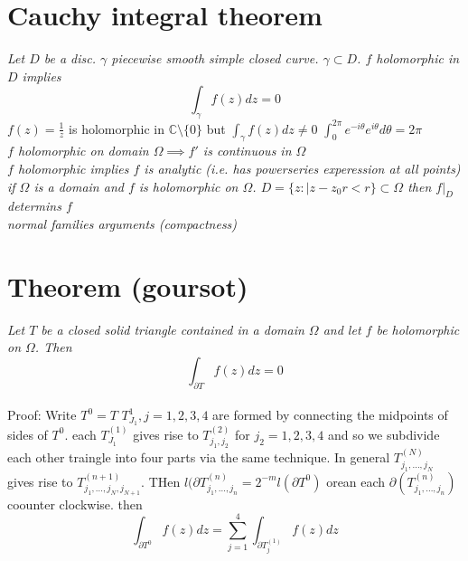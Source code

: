 \documentclass[11pt]{article}
\begin{document}
\section{Cauchy integral theorem}
\emph{
    Let $ D$ be a disc.  $\gamma$ piecewise smooth simple closed curve. $\gamma \subset D$. $f$ holomorphic in $D$  implies
     \[
    \int_{\gamma}^{}f(z)dz = 0
    \]
}
$f(z) = \frac{1}{z}$ is holomorphic in $ \mathbb{C} \setminus \{0\}$ but $\int_{ \gamma}^{}f(z)dz \ne 0$ $\int_{0}^{2\pi}e^{-i\theta}e^{i\theta}d\theta = 2\pi$
\\
\emph{
    $f$ holomorphic on domain $\Omega \implies f'$ is continuous in  $\Omega$
}
\\
\emph{
    $f$ holomorphic implies $f$ is analytic (i.e. has powerseries experession at all points)
}
\\
\emph{
    if $\Omega$ is a domain and  $f$ is holomorphic on $\Omega$.  $D = \{z : |z-z_0r < r\} \subset \Omega$ then $f|_{D}$ determins  $f$
}
\\
\emph{
    normal families arguments (compactness)
}

\section{Theorem (goursot)}
\emph{
    Let $T$ be a closed solid triangle contained in a domain  $\Omega$ and let  $f$ be holomorphic on $\Omega$.
    Then
    \[
    \int_{\partial T}^{}f(z)dz = 0
    \] 
}
\\Proof:
Write $T^{0} = T$ $T_{J_1}^{1}, j=1,2,3,4$  are formed by connecting the midpoints of sides of $T^{0}$.
each $T_{J_1}^{(1)}$ gives rise to $T_{j_1,j_2}^{(2)}$
 for $j_2=1,2,3,4$ and so we subdivide each other traingle into four parts via the same technique.
 In general $T_{j_1,\dots,j_N}^{(N)}$ gives rise to $T_{j_1,\dots,j_N,j_{N+1}}^{(n+1)}$.
 THen
 $l(\partial T_{j_1,\dots,j_n}^{(n)} = 2^{-m} l(\partial T^{0})$ orean each 
 $\partial(T_{j_1,\dots,j_n}^{(n)})$ coounter clockwise.
 then
 \[
     \int_{\partial T^{0}}^{}f(z)dz = \sum_{j=1}^{4}\int_{\partial T_{j}^{(1)}}^{}f(z)dz
 \] 
\end{document}
